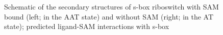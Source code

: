 \documentclass[a4paper,10pt]{article}
\begin{document}
\begin{figure}
   \hspace{0.05in}
\caption{Schematic of the secondary structures of s-box riboswitch with SAM bound (left; in the AAT state) and without SAM 
(right; in the AT state); predicted ligand-SAM interactions with s-box}
\end{figure}
\end{document}
